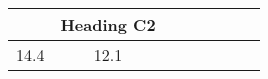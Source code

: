 \begin{tabular}{cccccccc}
{Heading C1 (\} & {Heading C2} \\ \midrule
{14.4} & {12.1} \\
\end{tabular}